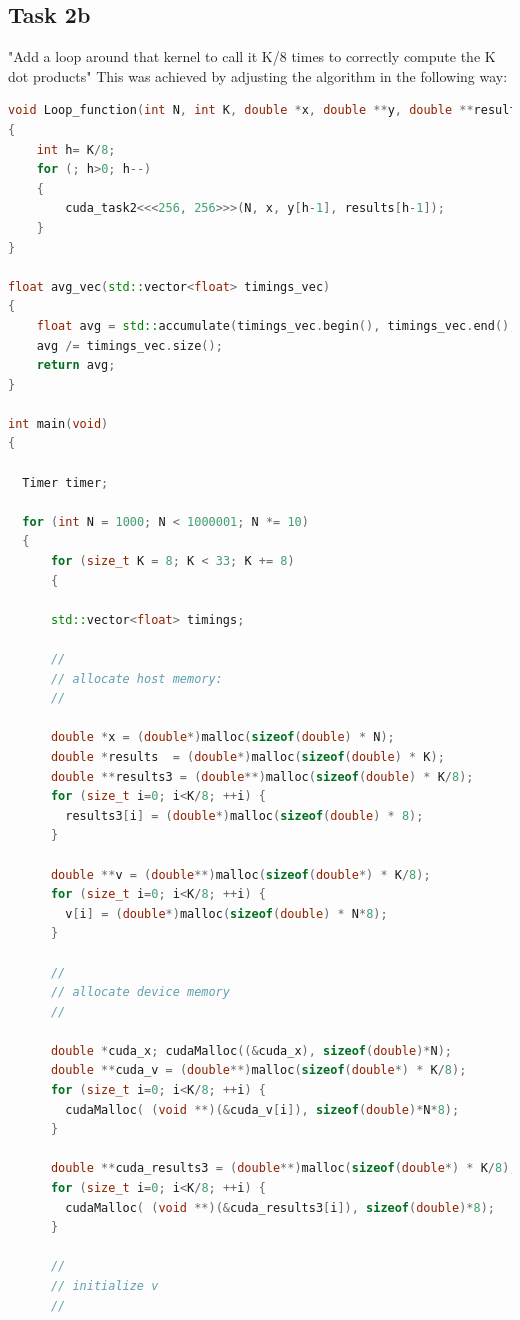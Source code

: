 \pagebreak

\subsection{Task 2b}
"Add a loop around that kernel to call it K/8 times to correctly compute the K dot products"
This was achieved by adjusting the algorithm in the following way:

\begin{lstlisting}[language=C++, title=C++ Cuda Code adaptation 2b]
void Loop_function(int N, int K, double *x, double **y, double **results)
{
    int h= K/8;
    for (; h>0; h--)
    {
        cuda_task2<<<256, 256>>>(N, x, y[h-1], results[h-1]);
    }
}

float avg_vec(std::vector<float> timings_vec)
{
    float avg = std::accumulate(timings_vec.begin(), timings_vec.end(), 0.0);
    avg /= timings_vec.size();
    return avg;
}

int main(void)
{

  Timer timer;

  for (int N = 1000; N < 1000001; N *= 10)
  {
      for (size_t K = 8; K < 33; K += 8)
      {

      std::vector<float> timings;

      //
      // allocate host memory:
      //
      
      double *x = (double*)malloc(sizeof(double) * N);
      double *results  = (double*)malloc(sizeof(double) * K);
      double **results3 = (double**)malloc(sizeof(double) * K/8);
      for (size_t i=0; i<K/8; ++i) {
        results3[i] = (double*)malloc(sizeof(double) * 8);
      }

      double **v = (double**)malloc(sizeof(double*) * K/8);
      for (size_t i=0; i<K/8; ++i) {
        v[i] = (double*)malloc(sizeof(double) * N*8);
      }

      //
      // allocate device memory
      //

      double *cuda_x; cudaMalloc((&cuda_x), sizeof(double)*N);
      double **cuda_v = (double**)malloc(sizeof(double*) * K/8);  
      for (size_t i=0; i<K/8; ++i) {
        cudaMalloc( (void **)(&cuda_v[i]), sizeof(double)*N*8);
      }

      double **cuda_results3 = (double**)malloc(sizeof(double*) * K/8); 
      for (size_t i=0; i<K/8; ++i) {
        cudaMalloc( (void **)(&cuda_results3[i]), sizeof(double)*8);
      }
    
      //
      // initialize v
      //


\end{lstlisting}
